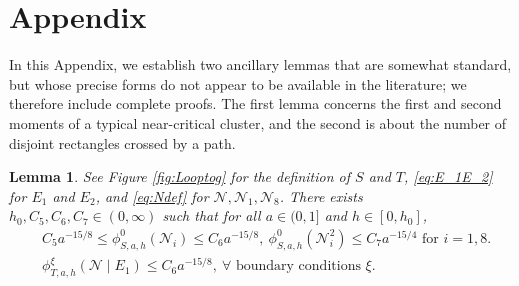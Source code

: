 \documentclass[article,12pt,reqno]{amsart}
\newtheorem{lemma}[theorem]{Lemma}
\begin{document}
\section*{Appendix}
In this Appendix, we establish two ancillary lemmas that are somewhat standard, but whose precise forms do not appear to be available in the literature; we therefore include complete proofs. The first lemma concerns the first and second moments of a typical near-critical cluster, and the second is about the number of disjoint rectangles crossed by a path.
\begin{lemma}\label{lem:moments}
	See Figure \ref{fig:Looptog} for the definition of $S$ and $T$, \eqref{eq:E_1E_2} for $E_1$ and $E_2$, and \eqref{eq:Ndef} for $\mathcal{N},\mathcal{N}_1,\mathcal{N}_8$.
	There exists $h_0, C_5, C_6, C_7\in(0,\infty)$ such that for all $a\in(0,1]$ and $h\in[0,h_0]$,
	\begin{align*}
		&C_5 a^{-15/8}\leq \phi_{S,a,h}^0(\mathcal{N}_i)\leq C_6 a^{-15/8},~\phi_{S,a,h}^0(\mathcal{N}_i^2)\leq C_7 a^{-15/4} \text{ for }i=1,8.\\
		&\phi_{T,a,h}^{\xi}(\mathcal{N} \mid E_1)\leq C_6 a^{-15/8},~\forall \text{ boundary conditions }\xi.
	\end{align*}
\end{lemma}
\end{document}
